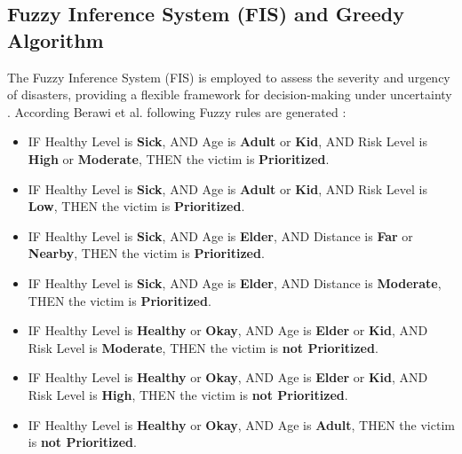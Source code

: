 \documentclass[conference,final,a4paper,twoside,10pt]{IEEEtran}
\begin{document}
\subsection{Fuzzy Inference System (FIS) and Greedy Algorithm}
The Fuzzy Inference System (FIS) is employed to assess the severity and urgency of disasters, providing a flexible framework for decision-making under uncertainty \cite{berawi2020prioritized}. According Berawi et al. following Fuzzy rules are generated :

\begin{itemize}
    \item IF Healthy Level is \textbf{Sick}, AND Age is \textbf{Adult} or \textbf{Kid}, AND Risk Level is \textbf{High} or \textbf{Moderate}, THEN the victim is \textbf{Prioritized}.
    
    \item IF Healthy Level is \textbf{Sick}, AND Age is \textbf{Adult} or \textbf{Kid}, AND Risk Level is \textbf{Low}, THEN the victim is \textbf{Prioritized}.
    
    \item IF Healthy Level is \textbf{Sick}, AND Age is \textbf{Elder}, AND Distance is \textbf{Far} or \textbf{Nearby}, THEN the victim is \textbf{Prioritized}.
    
    \item IF Healthy Level is \textbf{Sick}, AND Age is \textbf{Elder}, AND Distance is \textbf{Moderate}, THEN the victim is \textbf{Prioritized}.
    
    \item IF Healthy Level is \textbf{Healthy} or \textbf{Okay}, AND Age is \textbf{Elder} or \textbf{Kid}, AND Risk Level is \textbf{Moderate}, THEN the victim is \textbf{not Prioritized}.
    
    \item IF Healthy Level is \textbf{Healthy} or \textbf{Okay}, AND Age is \textbf{Elder} or \textbf{Kid}, AND Risk Level is \textbf{High}, THEN the victim is \textbf{not Prioritized}.
    
    \item IF Healthy Level is \textbf{Healthy} or \textbf{Okay}, AND Age is \textbf{Adult}, THEN the victim is \textbf{not Prioritized}.
\end{itemize}
\end{document}
